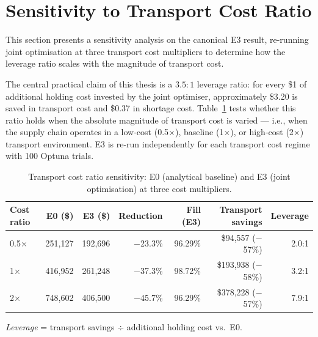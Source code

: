 \section{Sensitivity to Transport Cost Ratio}
\label{sec:results:cost-ratio}

This section presents a sensitivity analysis on the canonical E3 result,
re-running joint optimisation at three transport cost multipliers to
determine how the leverage ratio scales with the magnitude of transport cost.

The central practical claim of this thesis is a $3.5{:}1$ leverage
ratio: for every \$1 of additional holding cost invested by the joint
optimiser, approximately \$3.20 is saved in transport cost and \$0.37
in shortage cost.  Table~\ref{tab:cost-ratio} tests whether this ratio
holds when the absolute magnitude of transport cost is varied — i.e.,
when the supply chain operates in a low-cost (0.5$\times$), baseline
(1$\times$), or high-cost (2$\times$) transport environment.  E3 is
re-run independently for each transport cost regime with 100 Optuna trials.

\begin{table}[htbp]
  \centering
  \caption{Transport cost ratio sensitivity: E0 (analytical baseline) and E3 (joint optimisation) at three cost multipliers.}
  \label{tab:cost-ratio}
  \renewcommand{\arraystretch}{1.1}
  \begin{tabular}{@{}lrrrrrr@{}}
    \toprule
    Cost ratio & E0 (\$) & E3 (\$) & Reduction & Fill (E3) & Transport savings & Leverage \\
    \midrule
    0.5$\times$ & 251,127 & 192,696 & $-$23.3\% & 96.29\% & \$94,557 ($-$57\%) & 2.0:1 \\
    1$\times$   & 416,952 & 261,248 & $-$37.3\% & 98.72\% & \$193,938 ($-$58\%) & 3.2:1 \\
    2$\times$   & 748,602 & 406,500 & $-$45.7\% & 96.29\% & \$378,228 ($-$57\%) & 7.9:1 \\
    \bottomrule
  \end{tabular}
  \par\vspace{4pt}
  \raggedright\small
  \textit{Leverage} = transport savings $\div$ additional holding cost vs.\ E0.
\end{table}

